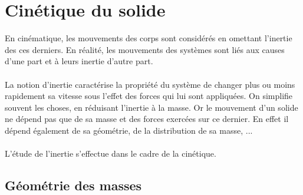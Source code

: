 \chapter{Cinétique du solide}
En cinématique, les mouvements des corps sont considérés en omettant l'inertie des ces derniers.
En réalité, les mouvements des systèmes sont liés aux causes d'une part et à leurs inertie d'autre part.\\
\\
La notion d'inertie caractérise la propriété du système de changer plus ou moins rapidement sa vitesse sous l'effet des forces qui lui sont appliquées.
On simplifie souvent les choses, en réduisant l'inertie à la masse. Or le mouvement d'un solide ne dépend pas que de sa masse et des forces exercées sur ce dernier.
En effet il dépend également de sa géométrie, de la distribution de sa masse, ...
\\
\\
L'étude de l'inertie s'effectue dans le cadre de la cinétique.
\section{Géométrie des masses}
